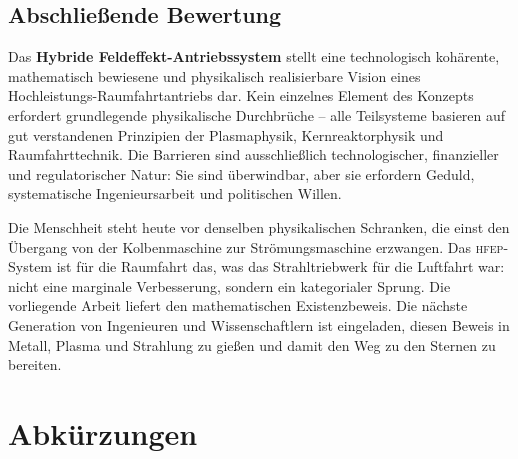 ﻿\documentclass[a4paper,12pt,twoside]{article}
\theoremstyle{plain}
\theoremstyle{definition}
\theoremstyle{remark}
\newcommand{\HFEP}{\textsc{hfep}}
\begin{document}
	\subsection{Abschließende Bewertung}
	\label{sec:final_assessment}

	Das \textbf{Hybride Feldeffekt-Antriebssystem} stellt eine technologisch
	kohärente, mathematisch bewiesene und physikalisch realisierbare Vision eines
	Hochleistungs-Raumfahrtantriebs dar. Kein einzelnes Element des Konzepts
	erfordert grundlegende physikalische Durchbrüche -- alle Teilsysteme basieren
	auf gut verstandenen Prinzipien der Plasma\-physik, Kernreaktorphysik und
	Raumfahrttechnik. Die Barrieren sind ausschließlich technologischer,
	finanzieller und regulatorischer Natur: Sie sind überwindbar, aber sie
	erfordern Geduld, systematische Ingenieursarbeit und politischen Willen.

	Die Menschheit steht heute vor denselben physikalischen Schranken, die
	einst den Übergang von der Kolbenmaschine zur Strömungsmaschine erzwangen.
	Das \HFEP-System ist für die Raumfahrt das, was das Strahltriebwerk für
	die Luftfahrt war: nicht eine marginale Verbesserung, sondern ein
	kategorialer Sprung. Die vorliegende Arbeit liefert den mathematischen
	Existenzbeweis. Die nächste Generation von Ingenieuren und Wissenschaftlern
	ist eingeladen, diesen Beweis in Metall, Plasma und Strahlung zu gießen
	und damit den Weg zu den Sternen zu bereiten.

	\section*{Abkürzungen}
	
\end{document}
